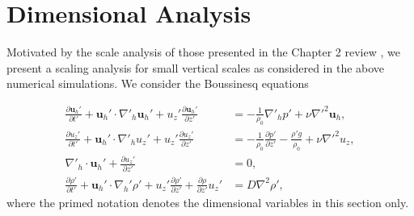 \section{Dimensional Analysis}
Motivated by the scale analysis of those presented in the Chapter 2 review \cite{lilly1983,rileylelong2000,bc2001,brethouwer2007}, we present a scaling analysis for small vertical scales as considered in the above numerical simulations. We consider the Boussinesq equations

\begin{align}
\frac{\partial \textbf{u}_{h}'}{\partial t'} + \textbf{u}_{h}'\cdot\nabla'_{h}\textbf{u}_{h}'+u_{z}'\frac{\partial \textbf{u}_{h}'}{\partial z'} &= -\frac{1}{\rho_{0}}\nabla'_{h}p' + \nu \nabla'^{2}\textbf{u}_{h}\label{scaling_horz},\\
\frac{\partial u_{z}'}{\partial t'} + \textbf{u}_{h}'\cdot\nabla'_{h}u_{z}'+u_{z}'\frac{\partial u_{z}'}{\partial z'} &= -\frac{1}{\rho_{0}}\frac{\partial p'}{\partial z'} - \frac{\rho' g}{\rho_{0}} + \nu \nabla'^{2}u_{z},\label{scaling_vert}\\
\nabla'_{h}\cdot\textbf{u}_{h}' + \frac{\partial u_{z}'}{\partial z'} &=0,\label{scaling_cont}\\
\frac{\partial \rho'}{\partial t'} + \textbf{u}_{h}'\cdot\nabla_{h}'\rho' + u_{z}'\frac{\partial \rho'}{\partial z'} + \frac{\partial \rho}{\partial z'}u_{z}'&=D\nabla^{2}\rho ',\label{scaling_moment}
\end{align}
where the primed notation denotes the dimensional variables in this section only. 


